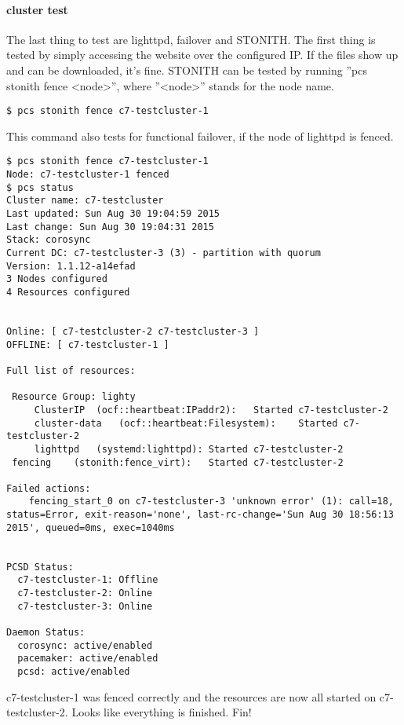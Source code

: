 \paragraph{cluster test}
The last thing to test are lighttpd, failover and \ac{STONITH}.
The first thing is tested by simply accessing the website over the configured IP.
If the files show up and can be downloaded, it's fine.
\ac{STONITH} can be tested by running ''pcs stonith fence <node>'', where
''<node>'' stands for the node name.
\begin{lstlisting}
$ pcs stonith fence c7-testcluster-1
\end{lstlisting}
This command also tests for functional failover, if the node of lighttpd is fenced.
\begin{lstlisting}
$ pcs stonith fence c7-testcluster-1
Node: c7-testcluster-1 fenced
$ pcs status
Cluster name: c7-testcluster
Last updated: Sun Aug 30 19:04:59 2015
Last change: Sun Aug 30 19:04:31 2015
Stack: corosync
Current DC: c7-testcluster-3 (3) - partition with quorum
Version: 1.1.12-a14efad
3 Nodes configured
4 Resources configured


Online: [ c7-testcluster-2 c7-testcluster-3 ]
OFFLINE: [ c7-testcluster-1 ]

Full list of resources:

 Resource Group: lighty
     ClusterIP	(ocf::heartbeat:IPaddr2):	Started c7-testcluster-2 
     cluster-data	(ocf::heartbeat:Filesystem):	Started c7-testcluster-2 
     lighttpd	(systemd:lighttpd):	Started c7-testcluster-2 
 fencing	(stonith:fence_virt):	Started c7-testcluster-2 

Failed actions:
    fencing_start_0 on c7-testcluster-3 'unknown error' (1): call=18, status=Error, exit-reason='none', last-rc-change='Sun Aug 30 18:56:13 2015', queued=0ms, exec=1040ms


PCSD Status:
  c7-testcluster-1: Offline
  c7-testcluster-2: Online
  c7-testcluster-3: Online

Daemon Status:
  corosync: active/enabled
  pacemaker: active/enabled
  pcsd: active/enabled
\end{lstlisting}
c7-testcluster-1 was fenced correctly and the resources are now all started on c7-testcluster-2.
Looks like everything is finished. Fin!


